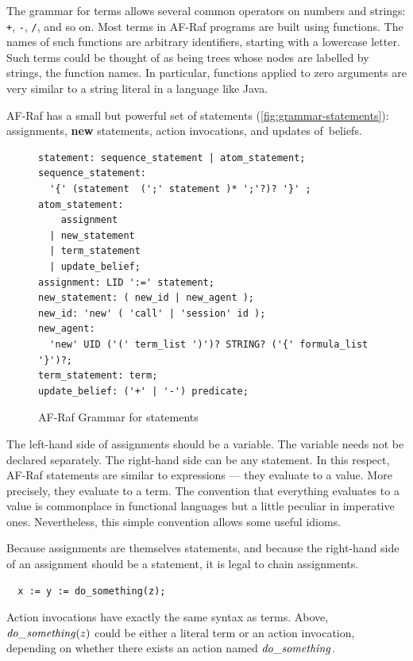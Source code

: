 \documentclass[a4paper,12pt,oneside,fleqn]{book} %
\begin{document}
The grammar for terms allows several common operators on numbers and
strings: \verb-+-, \verb+-+, \verb+/+, and so on. Most terms in AF-Raf
programs are built using functions. The names of such functions are
arbitrary identifiers, starting with a lowercase letter. Such terms could
be thought of as being trees whose nodes are labelled by strings, the
function names. In particular, functions applied to zero arguments are very
similar to a string literal in a language like Java.

AF-Raf has a small but powerful set of statements
(\autoref{fig:grammar-statements}): assignments, {\bf new} statements,
action invocations, and updates of~beliefs.

\begin{figure}\footnotesize %
\begin{verbatim}
statement: sequence_statement | atom_statement;
sequence_statement:
  '{' (statement  (';' statement )* ';'?)? '}' ;
atom_statement:
    assignment
  | new_statement
  | term_statement
  | update_belief;
assignment: LID ':=' statement;
new_statement: ( new_id | new_agent );
new_id: 'new' ( 'call' | 'session' id );
new_agent:
  'new' UID ('(' term_list ')')? STRING? ('{' formula_list '}')?;
term_statement: term;
update_belief: ('+' | '-') predicate;
\end{verbatim}
\caption{AF-Raf Grammar for statements}
\label{fig:grammar-statements}
\end{figure} %

The left-hand side of assignments should be a variable. The variable needs
not be declared separately.  The right-hand side can be any statement.  In
this respect, AF-Raf statements are similar to expressions --- they
evaluate to a value. More precisely, they evaluate to a term. The
convention that everything evaluates to a value is commonplace in
functional languages but a little peculiar in imperative ones.
Nevertheless, this simple convention allows some useful idioms.

\begin{example}
Because assignments are themselves statements, and because the right-hand
side of an assignment should be a statement, it is legal to chain
assignments.
\begin{verbatim}
  x := y := do_something(z);
\end{verbatim}
Action invocations have exactly the same syntax as terms. Above, ${\it
do\_something}(z)$ could be either a literal term or an action invocation,
depending on whether there exists an action named ${\it do\_something}$.
\end{example}
\end{document}
